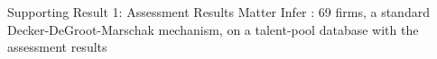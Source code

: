 \begin{frame}{Supporting Result 1: Assessment Results Matter}
    Infer : 69 firms, a standard Decker-DeGroot-Marschak mechanism, on a talent-pool database with the assessment results
\end{frame}


